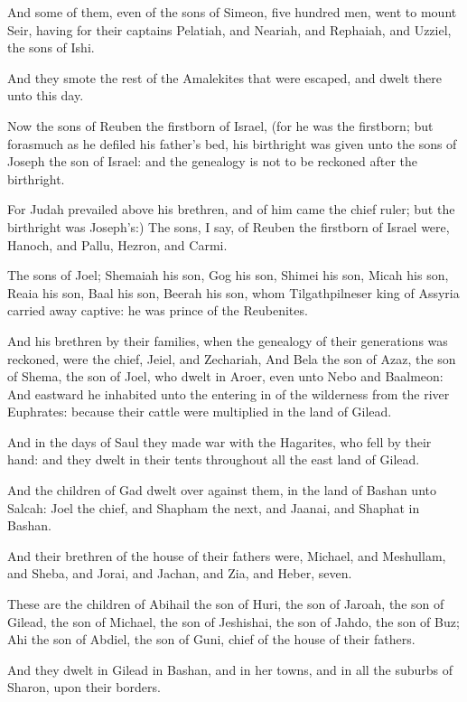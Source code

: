\Verse And some of them, even of the sons of Simeon, five hundred men, went to mount Seir, having for their captains Pelatiah, and Neariah, and Rephaiah, and Uzziel, the sons of Ishi.

\Verse And they smote the rest of the Amalekites that were escaped, and dwelt there unto this day.


\Chapter
\Verse Now the sons of Reuben the firstborn of Israel, (for he was the firstborn; but forasmuch as he defiled his father's bed, his birthright was given unto the sons of Joseph the son of Israel: and the genealogy is not to be reckoned after the birthright.

\Verse For Judah prevailed above his brethren, and of him came the chief ruler; but the birthright was Joseph's:) \Verse The sons, I say, of Reuben the firstborn of Israel were, Hanoch, and Pallu, Hezron, and Carmi.

\Verse The sons of Joel; Shemaiah his son, Gog his son, Shimei his son, \Verse Micah his son, Reaia his son, Baal his son, \Verse Beerah his son, whom Tilgathpilneser king of Assyria carried away captive: he was prince of the Reubenites.

\Verse And his brethren by their families, when the genealogy of their generations was reckoned, were the chief, Jeiel, and Zechariah, \Verse And Bela the son of Azaz, the son of Shema, the son of Joel, who dwelt in Aroer, even unto Nebo and Baalmeon: \Verse And eastward he inhabited unto the entering in of the wilderness from the river Euphrates: because their cattle were multiplied in the land of Gilead.

\Verse And in the days of Saul they made war with the Hagarites, who fell by their hand: and they dwelt in their tents throughout all the east land of Gilead.

\Verse And the children of Gad dwelt over against them, in the land of Bashan unto Salcah: \Verse Joel the chief, and Shapham the next, and Jaanai, and Shaphat in Bashan.

\Verse And their brethren of the house of their fathers were, Michael, and Meshullam, and Sheba, and Jorai, and Jachan, and Zia, and Heber, seven.

\Verse These are the children of Abihail the son of Huri, the son of Jaroah, the son of Gilead, the son of Michael, the son of Jeshishai, the son of Jahdo, the son of Buz; \Verse Ahi the son of Abdiel, the son of Guni, chief of the house of their fathers.

\Verse And they dwelt in Gilead in Bashan, and in her towns, and in all the suburbs of Sharon, upon their borders.

